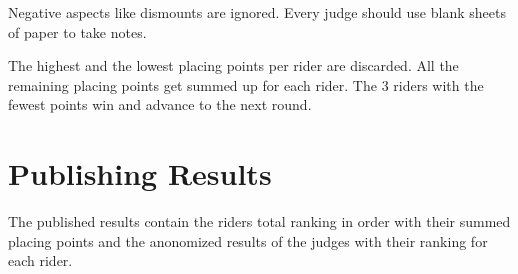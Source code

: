 Negative aspects like dismounts are ignored.
Every judge should use blank sheets of paper to take notes.

The highest and the lowest placing points per rider are discarded.
All the remaining placing points get summed up for each rider.
The 3 riders with the fewest points win and advance to the next round.

\section{Publishing Results}

The published results contain the riders total ranking in order with their summed placing points and the anonomized results of the judges with their ranking for each rider.